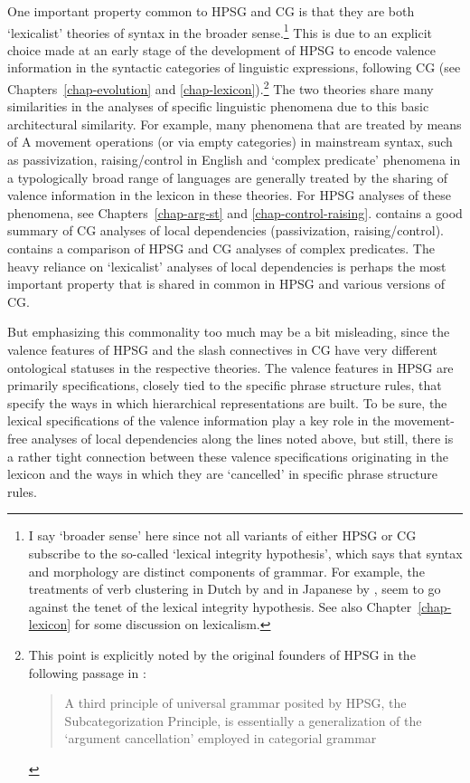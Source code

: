 \documentclass[output=paper]{langsci/langscibook}
\begin{document}
One important property common to HPSG and CG is that they are both
`lexicalist' theories of syntax in the broader sense.\footnote{I say
`broader sense' here since not all variants of either HPSG or CG subscribe to the
so-called `lexical integrity hypothesis', which says that syntax and
morphology are distinct components of grammar. For example,
the treatments of verb clustering in Dutch by \citet{moortgatoehrle94} and
in Japanese by \citet{Kubota2014a-u}, seem to go against the tenet of the
lexical integrity hypothesis. See also Chapter~\ref{chap-lexicon} for some discussion
on lexicalism.} 
This is due to an explicit choice made at an early
stage of the development of HPSG to encode valence information in the
syntactic categories of linguistic expressions, following CG (see
Chapters~\ref{chap-evolution} and \ref{chap-lexicon}).\footnote{This
  point is explicitly noted by the original founders of HPSG
  in the following passage in \citet[11]{ps}:

\begin{quote}
A third principle of universal grammar posited by HPSG, the
Subcategorization Principle, is essentially a generalization of the
`argument cancellation' employed in categorial grammar
\end{quote}

}
The two theories share many similarities in the
analyses of specific linguistic phenomena due to this basic
architectural similarity. For example, many phenomena that are treated
by means of A movement operations (or via empty categories) in
mainstream syntax, such as passivization, raising/control in English
and `complex predicate' phenomena in a typologically broad range of
languages are generally treated by the sharing of valence information
in the lexicon in these theories. For HPSG
analyses of these phenomena, see Chapters~\ref{chap-arg-st} and \ref{chap-control-raising}.
\citet{steedman2011ccg} contains a good
summary of CG analyses of local dependencies 
(passivization, raising/control). \citet{Kubota2014a-u} contains
a comparison of HPSG and CG analyses of complex predicates.
The heavy reliance on `lexicalist' analyses of
local dependencies 
is perhaps the most important property that is shared in common in
HPSG and various versions of CG.

But emphasizing this commonality too much may be a bit misleading,
since the valence features of HPSG and the slash connectives in CG
have very different ontological statuses in the respective theories.
The valence features in HPSG are primarily specifications, closely
tied to the specific phrase structure rules, that specify the ways in
which hierarchical representations are built. To be sure, the lexical
specifications of the valence information play a key role in the
movement-free analyses of local dependencies along the lines noted
above, but still, there is a rather tight connection between these
valence specifications originating in the lexicon and the ways in
which they are `cancelled' in specific phrase structure rules.
\end{document}

